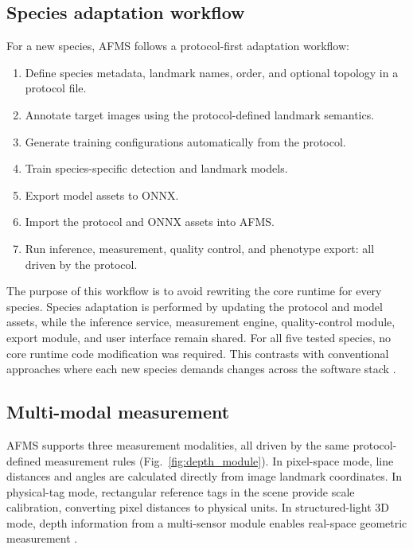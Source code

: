 \documentclass[final,3p,times]{elsarticle}
\begin{document}
\subsection{Species adaptation workflow}

For a new species, AFMS follows a protocol-first adaptation workflow:

\begin{enumerate}
  \item Define species metadata, landmark names, order, and optional topology in a protocol file.
  \item Annotate target images using the protocol-defined landmark semantics.
  \item Generate training configurations automatically from the protocol.
  \item Train species-specific detection and landmark models.
  \item Export model assets to ONNX.
  \item Import the protocol and ONNX assets into AFMS.
  \item Run inference, measurement, quality control, and phenotype export: all driven by the protocol.
\end{enumerate}

The purpose of this workflow is to avoid rewriting the core runtime for every species. Species adaptation is performed by updating the protocol and model assets, while the inference service, measurement engine, quality-control module, export module, and user interface remain shared. For all five tested species, no core runtime code modification was required. This contrasts with conventional approaches where each new species demands changes across the software stack \citep{liu2024fishphenokey,he2024measurement}.

\subsection{Multi-modal measurement}

AFMS supports three measurement modalities, all driven by the same protocol-defined measurement rules (Fig.~\ref{fig:depth_module}). In pixel-space mode, line distances and angles are calculated directly from image landmark coordinates. In physical-tag mode, rectangular reference tags in the scene provide scale calibration, converting pixel distances to physical units. In structured-light 3D mode, depth information from a multi-sensor module enables real-space geometric measurement \citep{veinidis2023reconstruction}.
\end{document}
